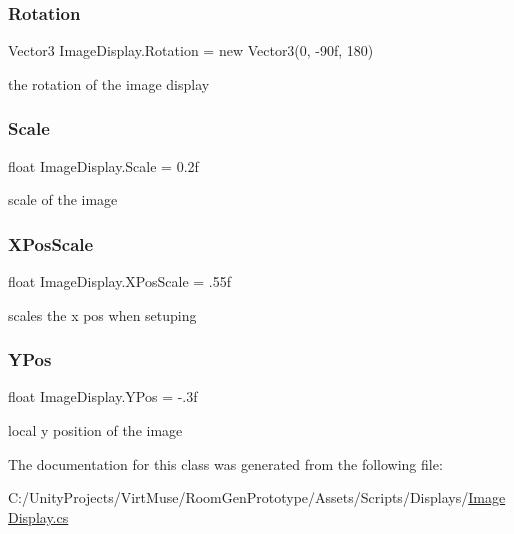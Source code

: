 \subsubsection{\texorpdfstring{Rotation}{Rotation}}
{\footnotesize\ttfamily Vector3 Image\+Display.\+Rotation = new Vector3(0, -\/90f, 180)\hspace{0.3cm}{\ttfamily [static]}}



the rotation of the image display 

\mbox{\label{class_image_display_aac7ba9a36c272ad5c6873119b521ed5e}} 
\subsubsection{\texorpdfstring{Scale}{Scale}}
{\footnotesize\ttfamily float Image\+Display.\+Scale = 0.\+2f\hspace{0.3cm}{\ttfamily [static]}}



scale of the image 

\mbox{\label{class_image_display_ae1044419b2f9dfa64d75329e48e312de}} 
\subsubsection{\texorpdfstring{X\+Pos\+Scale}{XPosScale}}
{\footnotesize\ttfamily float Image\+Display.\+X\+Pos\+Scale = .\+55f\hspace{0.3cm}{\ttfamily [static]}}



scales the x pos when setuping 

\mbox{\label{class_image_display_ac0ef458ef2e417549068a631e35f39d6}} 
\subsubsection{\texorpdfstring{Y\+Pos}{YPos}}
{\footnotesize\ttfamily float Image\+Display.\+Y\+Pos = -\/.\+3f\hspace{0.3cm}{\ttfamily [static]}}



local y position of the image 



The documentation for this class was generated from the following file\+:\begin{DoxyCompactItemize}
\item 
C\+:/\+Unity\+Projects/\+Virt\+Muse/\+Room\+Gen\+Prototype/\+Assets/\+Scripts/\+Displays/\mbox{\hyperlink{_image_display_8cs}{Image\+Display.\+cs}}\end{DoxyCompactItemize}
